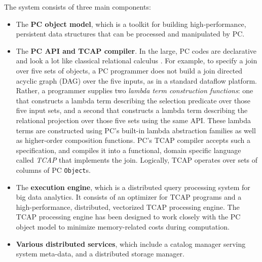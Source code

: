The system consists of three main components: 

\begin{itemize}
\item The \textbf{PC object model}, which is a toolkit for building high-performance, persistent data structures that can be 
processed and manipulated by PC.  

\item The \textbf{PC API and TCAP compiler}.  In the large, PC codes
  are declarative and look a lot like classical relational calculus
  \cite{codd1971data}.  For example, to specify a join over five sets
  of objects, a PC programmer does not build a join directed acyclic
  graph (DAG) over the five inputs, as in a standard
dataflow platform.  Rather, a programmer 
supplies two \emph{lambda term construction functions}: one that constructs a lambda term describing the selection
predicate over those five input sets, 
and a second that constructs a lambda term describing the relational projection over those five sets
using the same API.  These lambda terms are constructed using PC's built-in lambda abstraction families as well as higher-order composition functions.
 PC's TCAP compiler 
accepts such a specification, and compiles it into a functional, domain specific language called \emph{TCAP} that implements
the join.  Logically, TCAP operates over
sets of columns of PC \texttt{Object}s. 

\item The \textbf{execution engine}, which is a distributed query processing
  system for big data analytics. It consists of an optimizer for TCAP
  programs and a high-performance, distributed, vectorized TCAP
  processing engine.  
The TCAP processing engine has been designed to work closely with the PC object model to
minimize memory-related costs during computation.

\item \textbf{Various distributed services}, which include a catalog
  manager serving system meta-data, and a distributed storage manager.



\end{itemize}

